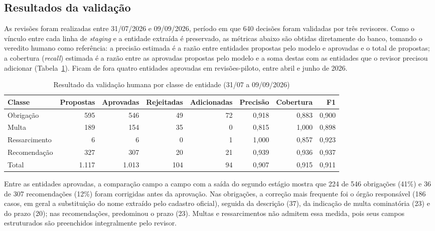 \subsection{Resultados da validação}
\label{subsec:validacao-resultados}

As revisões foram realizadas entre 31/07/2026 e 09/09/2026, período em que
640 decisões foram validadas por três revisores. Como o vínculo entre cada
linha de \emph{staging} e a entidade extraída é preservado, as métricas abaixo
são obtidas diretamente do banco, tomando o veredito humano como referência:
a precisão estimada é a razão entre entidades propostas pelo modelo e
aprovadas e o total de propostas; a cobertura (\emph{recall}) estimada é a
razão entre as aprovadas propostas pelo modelo e a soma destas com as
entidades que o revisor precisou adicionar
(Tabela~\ref{tab:validacao-resultados}). Ficam de fora quatro entidades
aprovadas em revisões-piloto, entre abril e junho de 2026.

\begin{table}[htbp]
\centering
\caption{Resultado da validação humana por classe de entidade (31/07 a 09/09/2026)}
\label{tab:validacao-resultados}
\begin{tabular}{lrrrrrrr}
\hline
Classe & Propostas & Aprovadas & Rejeitadas & Adicionadas & Precisão & Cobertura & F1 \\
\hline
Obrigação     &   595 &   546 &  49 & 72 & 0,918 & 0,883 & 0,900 \\
Multa         &   189 &   154 &  35 &  0 & 0,815 & 1,000 & 0,898 \\
Ressarcimento &     6 &     6 &   0 &  1 & 1,000 & 0,857 & 0,923 \\
Recomendação  &   327 &   307 &  20 & 21 & 0,939 & 0,936 & 0,937 \\
\hline
Total         & 1.117 & 1.013 & 104 & 94 & 0,907 & 0,915 & 0,911 \\
\hline
\end{tabular}
\end{table}

Entre as entidades aprovadas, a comparação campo a campo com a saída do
segundo estágio mostra que 224 de 546 obrigações (41\%) e 36 de 307
recomendações (12\%) foram corrigidas antes da aprovação. Nas obrigações, a
correção mais frequente foi o órgão responsável (186 casos, em geral a
substituição do nome extraído pelo cadastro oficial), seguida da descrição
(37), da indicação de multa cominatória (23) e do prazo (20); nas
recomendações, predominou o prazo (23). Multas e ressarcimentos não admitem
essa medida, pois seus campos estruturados são preenchidos integralmente pelo
revisor.

